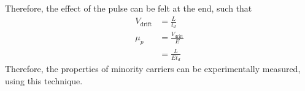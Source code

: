 \documentclass[titlepage, fleqn, a4paper, 12pt, twoside]{article}
\theoremstyle{definition}
\theoremstyle{theorem}
\begin{document}
Therefore, the effect of the pulse can be felt at the end, such that
\begin{align*}
	V_{\text{drift}} &= \frac{L}{t_d}\\
	\mu_p &= \frac{V_{\text{drift}}}{E}\\
	&= \frac{L}{E t_d}
\end{align*}
Therefore, the properties of minority carriers can be experimentally measured, using this technique.
\end{document}
